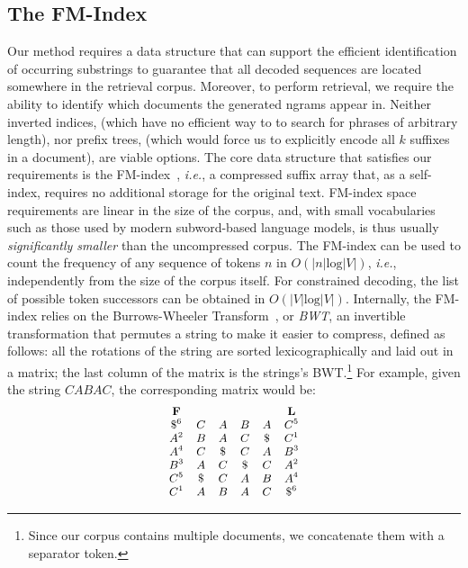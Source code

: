 \documentclass[11pt]{article}
\newcommand{\ie}{\textit{i.e.}}
\begin{document}
\subsection{The FM-Index}
\label{sec:fm-index}
Our method requires a data structure that can support the efficient identification of occurring substrings to guarantee that all decoded sequences are located somewhere in the retrieval corpus. Moreover, to perform retrieval, we require the ability to identify which documents the generated ngrams appear in. 
Neither inverted indices, (which have no efficient way to to search for phrases of arbitrary length),
nor prefix trees, (which would force us to explicitly encode all $k$ suffixes in a document), are viable options. 
The core data structure that satisfies our requirements is the 
FM-index~\citep{ferragina-manzini-2000-opportunistic}, \ie, a compressed suffix array that, as a self-index, requires no additional storage for the original text. FM-index space requirements are linear in the size of the corpus, and, with small vocabularies such as those used by modern subword-based language models, is thus usually \emph{significantly smaller} than the uncompressed corpus.
The FM-index can be used to count the frequency of any sequence of tokens $n$ in $O(|n| \text{log}|V|)$, \ie, independently from the size of the corpus itself. For constrained decoding, the list of possible token successors can be obtained in $O(|V| \text{log}|V|)$.
Internally, the FM-index relies on the Burrows-Wheeler Transform~\citep{Burrows94ablock-sorting}, or \emph{BWT}, an invertible transformation that permutes a string to make it easier to compress, defined as follows: all the rotations of the string are sorted lexicographically and laid out in a matrix; the last column of the matrix is the strings's BWT.\footnote{Since our corpus contains multiple documents, we concatenate them with a separator token.} For example, given the string $CABAC$, the corresponding matrix would be:
\begin{equation}
\nonumber
\footnotesize
\begin{matrix}
\textbf{F}  &   &   &   &   & \textbf{L} \\
\$^6 & C & A & B & A & C^5 \\
A^2 & B & A & C & \$ & C^1 \\
A^4 & C & \$ & C & A & B^3 \\
B^3 & A & C & \$ & C & A^2 \\
C^5 & \$ & C & A & B & A^4 \\
C^1 & A & B & A & C & \$^6 \\
\end{matrix}
\end{equation}
\end{document}
